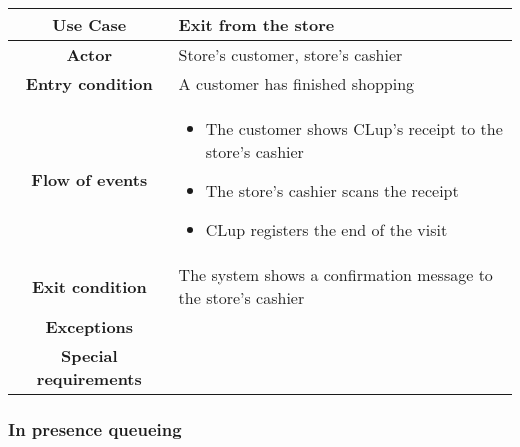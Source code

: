 \documentclass[../../main.tex]{subfiles}
\begin{document}
      \begin{table}[H]
        \centering
          \begin{tabular}{c m{}}
          \hline
          \textbf{Use Case} & Exit from the store\\ \hline
          \textbf{Actor} & Store's customer, store's cashier\\ \hline
          \textbf{Entry condition} & A customer has finished shopping\\  \hline
          \textbf{Flow of events} & \begin{itemize}
                                      \item The customer shows CLup's receipt to the store's cashier
                                      \item The store's cashier scans the receipt
                                      \item CLup registers the end of the visit
                                    \end{itemize}\\ \hline
          \textbf{Exit condition} & The system shows a confirmation message to the store's cashier \\ \hline
          \textbf{Exceptions} & \\ \hline
          \textbf{Special requirements} &\\ \hline
          \end{tabular}
      \end{table}

      \subsubsection{In presence queueing}
\end{document}
